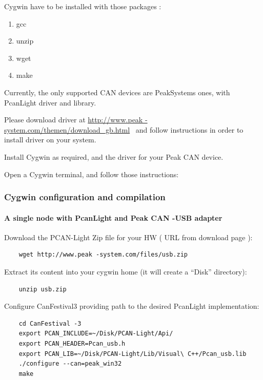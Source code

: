 \documentclass[12pt,english,a4paper]{book}
\begin{document}
Cygwin have to be installed with those packages :

\begin{enumerate}
\item gcc 
\item unzip 
\item wget 
\item make 
\end{enumerate}
Currently, the only supported CAN devices are PeakSystems ones, with
PcanLight driver and library.

Please download driver at \href{http://www.peak-system.com/themen/download_gb.html}{http://www.peak
-system.com/themen/download\_gb.html} \ and follow instructions
in order to install driver on your system.

Install Cygwin as required, and the driver for your Peak CAN device.

Open a Cygwin terminal, and follow those instructions:


\subsubsection{Cygwin configuration and compilation}


\paragraph{A single node with PcanLight and Peak CAN -USB adapter}

Download the PCAN-Light Zip file for your HW ( URL from download
page ):


\begin{verbatim}
	wget http://www.peak -system.com/files/usb.zip
\end{verbatim}


Extract its content into your cygwin home (it will create a {}``Disk''
directory):


\begin{verbatim}
	unzip usb.zip
\end{verbatim}


Configure CanFestival3 providing path to the desired PcanLight implementation:


\begin{verbatim}
	cd CanFestival -3
	export PCAN_INCLUDE=~/Disk/PCAN-Light/Api/
	export PCAN_HEADER=Pcan_usb.h
	export PCAN_LIB=~/Disk/PCAN-Light/Lib/Visual\ C++/Pcan_usb.lib
	./configure --can=peak_win32
	make
\end{verbatim}
\end{document}
